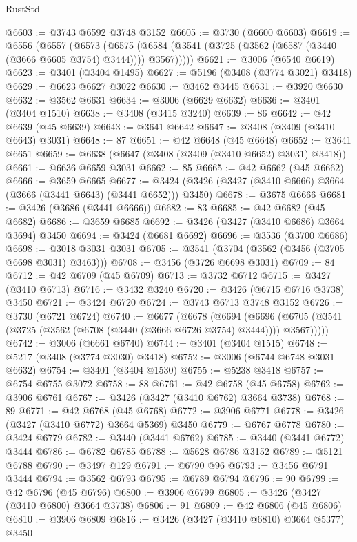 \begin{lexlean}{RustStd}
\begin{coremodule}
@6603 := @3743 @6592 @3748 @3152
@6605 := @3730 (@6600 @6603)
@6619 := @6556
    (@6557
      (@6573
        (@6575 (@6584 (@3541 (@3725 (@3562 (@6587 (@3440 (@3666 @6605 @3754) @3444)))) @3567)))))
@6621 := @3006 (@6540 @6619)
@6623 := @3401 (@3404 @1495)
@6627 := @5196 (@3408 (@3774 @3021) @3418)
@6629 := @6623 @6627 @3022
@6630 := @3462 @3445
@6631 := @3920 @6630
@6632 := @3562 @6631
@6634 := @3006 (@6629 @6632)
@6636 := @3401 (@3404 @1510)
@6638 := @3408 (@3415 @3240)
@6639 := 86
@6642 := @42 @6639 (@45 @6639)
@6643 := @3641 @6642
@6647 := @3408 (@3409 (@3410 @6643) @3031)
@6648 := 87
@6651 := @42 @6648 (@45 @6648)
@6652 := @3641 @6651
@6659 := @6638 (@6647 (@3408 (@3409 (@3410 @6652) @3031) @3418))
@6661 := @6636 @6659 @3031
@6662 := 85
@6665 := @42 @6662 (@45 @6662)
@6666 := @3659 @6665
@6677 := @3424 (@3426 (@3427 (@3410 @6666) @3664 (@3666 (@3441 @6643) (@3441 @6652))) @3450)
@6678 := @3675 @6666
@6681 := @3426 (@3686 (@3441 @6666))
@6682 := 83
@6685 := @42 @6682 (@45 @6682)
@6686 := @3659 @6685
@6692 := @3426 (@3427 (@3410 @6686) @3664 @3694) @3450
@6694 := @3424 (@6681 @6692)
@6696 := @3536 (@3700 @6686)
@6698 := @3018 @3031 @3031
@6705 := @3541 (@3704 (@3562 (@3456 (@3705 @6698 @3031) @3463)))
@6708 := @3456 (@3726 @6698 @3031)
@6709 := 84
@6712 := @42 @6709 (@45 @6709)
@6713 := @3732 @6712
@6715 := @3427 (@3410 @6713)
@6716 := @3432 @3240
@6720 := @3426 (@6715 @6716 @3738) @3450
@6721 := @3424 @6720
@6724 := @3743 @6713 @3748 @3152
@6726 := @3730 (@6721 @6724)
@6740 := @6677
    (@6678
      (@6694
        (@6696 (@6705 (@3541 (@3725 (@3562 (@6708 (@3440 (@3666 @6726 @3754) @3444)))) @3567)))))
@6742 := @3006 (@6661 @6740)
@6744 := @3401 (@3404 @1515)
@6748 := @5217 (@3408 (@3774 @3030) @3418)
@6752 := @3006 (@6744 @6748 @3031 @6632)
@6754 := @3401 (@3404 @1530)
@6755 := @5238 @3418
@6757 := @6754 @6755 @3072
@6758 := 88
@6761 := @42 @6758 (@45 @6758)
@6762 := @3906 @6761
@6767 := @3426 (@3427 (@3410 @6762) @3664 @3738)
@6768 := 89
@6771 := @42 @6768 (@45 @6768)
@6772 := @3906 @6771
@6778 := @3426 (@3427 (@3410 @6772) @3664 @5369) @3450
@6779 := @6767 @6778
@6780 := @3424 @6779
@6782 := @3440 (@3441 @6762)
@6785 := @3440 (@3441 @6772) @3444
@6786 := @6782 @6785
@6788 := @5628 @6786 @3152
@6789 := @5121 @6788
@6790 := @3497 @129
@6791 := @6790 @96
@6793 := @3456 @6791 @3444
@6794 := @3562 @6793
@6795 := @6789 @6794
@6796 := 90
@6799 := @42 @6796 (@45 @6796)
@6800 := @3906 @6799
@6805 := @3426 (@3427 (@3410 @6800) @3664 @3738)
@6806 := 91
@6809 := @42 @6806 (@45 @6806)
@6810 := @3906 @6809
@6816 := @3426 (@3427 (@3410 @6810) @3664 @5377) @3450

\end{coremodule}
\end{lexlean}
